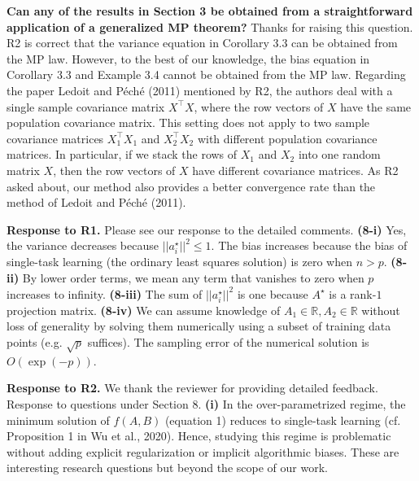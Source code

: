\documentclass{article}
\begin{document}
	\textbf{Can any of the results in Section 3 be obtained from a straightforward application of a generalized MP theorem?}
	Thanks for raising this question. R2 is correct that the variance equation in Corollary 3.3 can be obtained from the MP law.
	However, to the best of our knowledge, the bias equation in Corollary 3.3 and Example 3.4 cannot be obtained from the MP law.
	Regarding the paper Ledoit and P{\'e}ch{\'e} (2011) mentioned by R2, the authors deal with a single sample covariance matrix $X^\top X$, where the row vectors of $X$ have the same population covariance matrix.
	This setting does not apply to two sample covariance matrices $X_1^\top X_1$ and $X_2^\top X_2$ with different population covariance matrices.
	In particular, if we stack the rows of $X_1$ and $X_2$ into one random matrix $X$, then the row vectors of $X$ have different covariance matrices.
	As R2 asked about, our method also provides a better convergence rate than the method of Ledoit and P{\'e}ch{\'e} (2011).

	\textbf{Response to R1.} Please see our response to the detailed comments.
	\textbf{(8-i)} Yes, the variance decreases because $||{a_i^{\star}}||^2 \le 1$.
	The bias increases because the bias of single-task learning (the ordinary least squares solution) is zero when $n > p$.
	\textbf{(8-ii)} By lower order terms, we mean any term that vanishes to zero when $p$ increases to infinity.
	\textbf{(8-iii)} The sum of $||{a_i^{\star}}||^2$ is one because $A^{\star}$ is a rank-$1$ projection matrix.
	\textbf{(8-iv)} %
	We can assume knowledge of $A_1 \in \mathbb R, A_2 \in \mathbb R$ without loss of generality by solving them numerically using a subset of training data points (e.g. $\sqrt{p}$ suffices).
	The sampling error of the numerical solution is $O(\exp(-p))$.

	\textbf{Response to R2.} We thank the reviewer for providing detailed feedback.
	Response to questions under Section 8.
	\textbf{(i)}
	In the over-parametrized regime, the minimum solution of $f(A ,B)$ (equation 1) reduces to single-task learning  (cf. Proposition 1 in Wu et al., 2020).
	Hence, studying this regime is problematic without adding explicit regularization or implicit algorithmic biases.
	These are interesting research questions but beyond the scope of our work.
\end{document}
